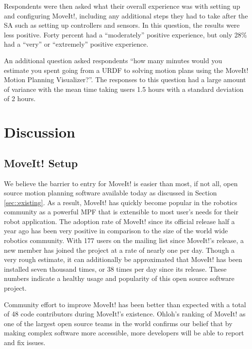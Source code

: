 \documentclass[10pt,journal,compsoc]{joser1}
\begin{document}
{Respondents were then asked what their overall experience was with setting up and configuring MoveIt!, including any additional steps they had to take after the SA such as setting up controllers and sensors. In this question, the results were less positive. Forty percent had a ``moderately'' positive experience, but only 28\% had a ``very'' or ``extremely'' positive experience. 

An additional question asked respondents ``how many minutes would you estimate you spent going from a URDF to solving motion plans using the MoveIt! Motion Planning Visualizer?''. The responses to this question had a large amount of variance with the mean time taking users 1.5 hours with a standard deviation of 2 hours.



\section{Discussion}
\label{sec::discussion}

\subsection{MoveIt! Setup}
\label{sec::moveit_discussion}

We believe the barrier to entry for MoveIt! is easier than most, if not all, open source motion planning software available today as discussed in Section \ref{sec::existing}. As a result, MoveIt! has quickly become popular in the robotics community as a powerful MPF that is extensible to most user's needs for their robot application. The adoption rate of MoveIt! since its official release half a year ago has been very positive in comparison to the size of the world wide robotics community. With 177 users on the mailing list since MoveIt!'s release, a new member has joined the project at a rate of nearly one per day. Though a very rough estimate, it can additionally be approximated that MoveIt! has been installed seven thousand times, or 38 times per day since its release. These numbers indicate a healthy usage and popularity of this open source software project.

Community effort to improve MoveIt! has been better than expected with a total of 48 code contributors during MoveIt!'s existence. Ohloh's ranking of MoveIt! as one of the largest open source teams in the world confirms our belief that by making complex software more accessible, more developers will be able to report and fix issues. 

}
\end{document}
